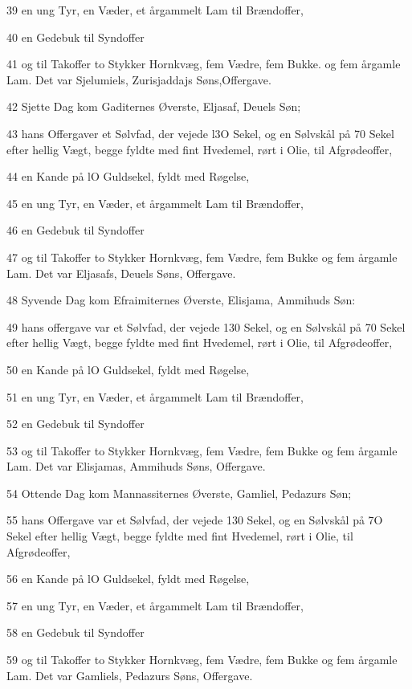 \par 39 en ung Tyr, en Væder, et årgammelt Lam til Brændoffer,
\par 40 en Gedebuk til Syndoffer
\par 41 og til Takoffer to Stykker Hornkvæg, fem Vædre, fem Bukke. og fem årgamle Lam. Det var Sjelumiels, Zurisjaddajs Søns,Offergave.
\par 42 Sjette Dag kom Gaditernes Øverste, Eljasaf, Deuels Søn;
\par 43 hans Offergaver et Sølvfad, der vejede l3O Sekel, og en Sølvskål på 70 Sekel efter hellig Vægt, begge fyldte med fint Hvedemel, rørt i Olie, til Afgrødeoffer,
\par 44 en Kande på lO Guldsekel, fyldt med Røgelse,
\par 45 en ung Tyr, en Væder, et årgammelt Lam til Brændoffer,
\par 46 en Gedebuk til Syndoffer
\par 47 og til Takoffer to Stykker Hornkvæg, fem Vædre, fem Bukke og fem årgamle Lam. Det var Eljasafs, Deuels Søns, Offergave.
\par 48 Syvende Dag kom Efraimiternes Øverste, Elisjama, Ammihuds Søn:
\par 49 hans offergave var et Sølvfad, der vejede 130 Sekel, og en Sølvskål på 70 Sekel efter hellig Vægt, begge fyldte med fint Hvedemel, rørt i Olie, til Afgrødeoffer,
\par 50 en Kande på lO Guldsekel, fyldt med Røgelse,
\par 51 en ung Tyr, en Væder, et årgammelt Lam til Brændoffer,
\par 52 en Gedebuk til Syndoffer
\par 53 og til Takoffer to Stykker Hornkvæg, fem Vædre, fem Bukke og fem årgamle Lam. Det var Elisjamas, Ammihuds Søns, Offergave.
\par 54 Ottende Dag kom Mannassiternes Øverste, Gamliel, Pedazurs Søn;
\par 55 hans Offergave var et Sølvfad, der vejede 130 Sekel, og en Sølvskål på 7O Sekel efter hellig Vægt, begge fyldte med fint Hvedemel, rørt i Olie, til Afgrødeoffer,
\par 56 en Kande på lO Guldsekel, fyldt med Røgelse,
\par 57 en ung Tyr, en Væder, et årgammelt Lam til Brændoffer,
\par 58 en Gedebuk til Syndoffer
\par 59 og til Takoffer to Stykker Hornkvæg, fem Vædre, fem Bukke og fem årgamle Lam. Det var Gamliels, Pedazurs Søns, Offergave.
